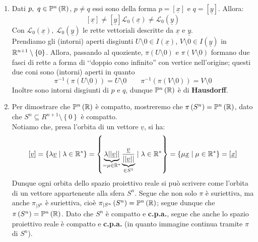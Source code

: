 \begin{demonstration}
\begin{enumerate}[label=\Roman*]
\item Dati $p,\ q\in\mathbb{P}^n\left(\realset\right)$, $p\neq q$ essi sono della forma $p=\left[\underline{x}\right]$ e $q=\left[\underline{y}\right]$. Allora:
\begin{equation*}
\left[\underline{x}\right]\neq\left[\underline{y}\right]\mathcal{L}_0\left(\underline{x}\right)\neq\mathcal{L}_0\left(\underline{y}\right)
\end{equation*}
Con $\mathcal{L}_0\left(\underline{x}\right),\ \mathcal{L}_0\left(\underline{y}\right)$ le rette vettoriali descritte da $\underline{x}$ e $\underline{y}$.\\
Prendiamo gli (intorni) aperti disgiunti $U\setminus{0}\in I\left(\underline{x}\right)$, $V\setminus{0}\in I\left(\underline{y}\right)$ in $\mathbb{R}^{n+1}\setminus\left\{0\right\}$. Allora, passando al quoziente, $\pi\left(U\setminus{0}\right)$ e $\pi\left(V\setminus{0}\right)$ formano due fasci di rette a forma di ‘‘doppio cono infinito'' con vertice nell'origine; questi due coni sono (intorni) aperti in quanto
\begin{equation*}
\pi^{-1}\left(\pi\left(U\setminus{0}\right)\right)=U\setminus{0}\qquad\pi^{-1}\left(\pi\left(V\setminus{0}\right)\right)=V\setminus{0}
\end{equation*}
Inoltre sono intorni disgiunti di $p$ e $q$, dunque $\mathbb{P}^n\left(\mathbb{R}\right)$ è di \textbf{Hausdorff}.
\item Per dimostrare che $\mathbb{P}^n\left(\mathbb{R}\right)$ è compatto, mostreremo che $\pi\left(S^n\right)=\mathbb{P}^n\left(\mathbb{R}\right)$, dato che $S^n\subseteq R^{n+1}\setminus\left\{0\right\}$ è compatto.\\
Notiamo che, presa l'orbita di un vettore $\underline{v}$, si ha:
\begin{equation*}
\left[\underline{v}\right]=\left\{\lambda \underline{v}\mid \lambda\in \mathbb{R}^{\ast}\right\}=\left\{\underbrace{\lambda \lvert\lvert\underline{v}\rvert\rvert}_{=\mu\in \mathbb{R}^{\ast}}\underbrace{\frac{\underline{v}}{\lvert\lvert\underline{v}\rvert\rvert}}_{\in S^1}\mid \lambda\in \mathbb{R}^{\ast}\right\}=\left\{\mu \underline{x}\mid \mu\in \mathbb{R}^{\ast}\right\}=\left[\underline{x}\right]
\end{equation*}
Dunque ogni orbita dello spazio proiettivo reale si può scrivere come l'orbita di un vettore appartenente alla sfera $S^n$. Segue che non solo $\pi$ è suriettiva, ma anche $\pi_{\mid S^n}$ è suriettiva, cioè $\pi_{\mid S^n}\left(S^n\right)=\mathbb{P}^n\left(\mathbb{R}\right)$; segue dunque che $\pi\left(S^n\right)=\mathbb{P}^n\left(\mathbb{R}\right)$. Dato che $S^n$ è compatto e \textbf{c.p.a.}, segue che anche lo spazio proiettivo reale è compatto e \textbf{c.p.a.} (in quanto immagine continua tramite $\pi$ di $S^n$).
\end{enumerate}
\end{demonstration}
